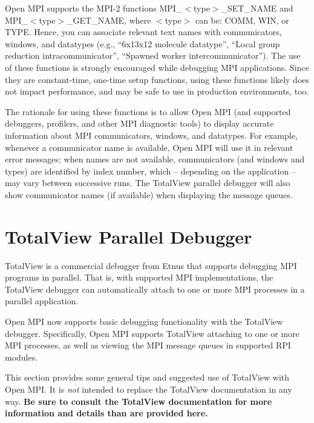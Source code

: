 Open MPI supports the MPI-2 functions {\sf
  MPI\_\-$<$type$>$\_\-SET\_\-NAME} and {\sf
  MPI\_\-$<$type$>$\_\-GET\_\-NAME}, where {\sf $<$type$>$} can be:
{\sf COMM}, {\sf WIN}, or {\sf TYPE}.  Hence, you can associate
relevant text names with communicators, windows, and datatypes (e.g.,
``6x13x12 molecule datatype'', ``Local group reduction
intracommunicator'', ``Spawned worker intercommunicator'').  The use
of these functions is strongly encouraged while debugging MPI
applications.  Since they are constant-time, one-time setup functions,
using these functions likely does not impact performance, and may be
safe to use in production environments, too.

The rationale for using these functions is to allow Open MPI (and
supported debuggers, profilers, and other MPI diagnostic tools) to
display accurate information about MPI communicators, windows, and
datatypes.  For example, whenever a communicator name is available,
Open MPI will use it in relevant error messages; when names are not
available, communicators (and windows and types) are identified by
index number, which -- depending on the application -- may vary
between successive runs.  The TotalView parallel debugger will also
show communicator names (if available) when displaying the message
queues.


\section{TotalView Parallel Debugger}
\label{sec:debug-totalview}

TotalView is a commercial debugger from Etnus that supports debugging
MPI programs in parallel.  That is, with supported MPI
implementations, the TotalView debugger can automatically attach to
one or more MPI processes in a parallel application.

Open MPI now supports basic debugging functionality with the TotalView
debugger.  Specifically, Open MPI supports TotalView attaching to one
or more MPI processes, as well as viewing the MPI message queues in
supported RPI modules.

This section provides some general tips and suggested use of TotalView
with Open MPI.  It is {\em not} intended to replace the TotalView
documentation in any way.  {\bf Be sure to consult the TotalView
  documentation for more information and details than are provided
  here.}

